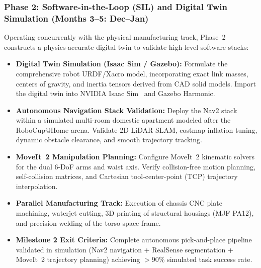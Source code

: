 \subsubsection{Phase 2: Software-in-the-Loop (SIL) and Digital Twin Simulation (Months 3--5: Dec--Jan)}
Operating concurrently with the physical manufacturing track, Phase~2 constructs a physics-accurate digital twin to validate high-level software stacks:
\begin{itemize}[leftmargin=1.5em]
  \item \textbf{Digital Twin Simulation (Isaac Sim / Gazebo):} Formulate the comprehensive robot URDF/Xacro model, incorporating exact link masses, centers of gravity, and inertia tensors derived from CAD solid models. Import the digital twin into NVIDIA Isaac Sim~\cite{isaaclab} and Gazebo Harmonic.
  \item \textbf{Autonomous Navigation Stack Validation:} Deploy the Nav2 stack within a simulated multi-room domestic apartment modeled after the RoboCup@Home arena. Validate 2D LiDAR SLAM, costmap inflation tuning, dynamic obstacle clearance, and smooth trajectory tracking.
  \item \textbf{MoveIt~2 Manipulation Planning:} Configure MoveIt~2 kinematic solvers for the dual 6-DoF arms and waist axis. Verify collision-free motion planning, self-collision matrices, and Cartesian tool-center-point (TCP) trajectory interpolation.
  \item \textbf{Parallel Manufacturing Track:} Execution of chassis CNC plate machining, waterjet cutting, 3D printing of structural housings (MJF PA12), and precision welding of the torso space-frame.
  \item \textbf{Milestone 2 Exit Criteria:} Complete autonomous pick-and-place pipeline validated in simulation (Nav2 navigation + RealSense segmentation + MoveIt~2 trajectory planning) achieving $>90\%$ simulated task success rate.
\end{itemize}

